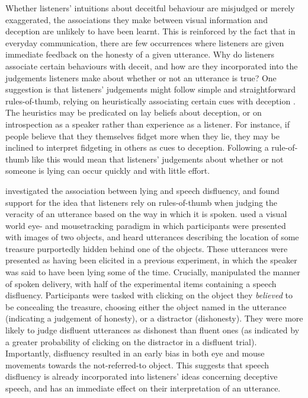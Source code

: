 \documentclass[a4paper,man,natbib]{apa6}
\begin{document}
Whether listeners' intuitions about deceitful behaviour are misjudged or merely exaggerated, the associations they make between visual information and deception are unlikely to have been learnt.
This is reinforced by the fact that in everyday communication, there are few occurrences where listeners are given immediate feedback on the honesty of a given utterance.
Why do listeners associate certain behaviours with deceit, and how are they incorporated into the judgements listeners make about whether or not an utterance is true?
One suggestion is that listeners' judgements might follow simple and straightforward rules-of-thumb, relying on heuristically associating certain cues with deception \citep{DePaulo1982}.
The heuristics may be predicated on lay beliefs about deception, or on introspection as a speaker rather than experience as a listener.
For instance, if people believe that they themselves fidget more when they lie, they may be inclined to interpret fidgeting in others as cues to deception.
Following a rule-of-thumb like this would mean that listeners' judgements about whether or not someone is lying can occur quickly and with little effort.

\citet{Loy2017} investigated the association between lying and speech disfluency, and found support for the idea that listeners rely on rules-of-thumb when judging the veracity of an utterance based on the way in which it is spoken.
\citeauthor{Loy2017} used a visual world eye- and mousetracking paradigm in which participants were presented with images of two objects, and heard utterances describing the location of some treasure purportedly hidden behind one of the objects.
These utterances were presented as having been elicited in a previous experiment, in which the speaker was said to have been lying some of the time.
Crucially, \citet{Loy2017} manipulated the manner of spoken delivery, with half of the experimental items containing a speech disfluency.
Participants were tasked with clicking on the object they \textit{believed} to be concealing the treasure, choosing either the object named in the utterance (indicating a judgement of honesty), or a distractor (dishonesty).
They were more likely to judge disfluent utterances as dishonest than fluent ones (as indicated by a greater probability of clicking on the distractor in a disfluent trial). 
Importantly, disfluency resulted in an early bias in both eye and mouse movements towards the not-referred-to object.
This suggests that speech disfluency is already incorporated into listeners' ideas concerning deceptive speech, and has an immediate effect on their interpretation of an utterance. 
\end{document}

